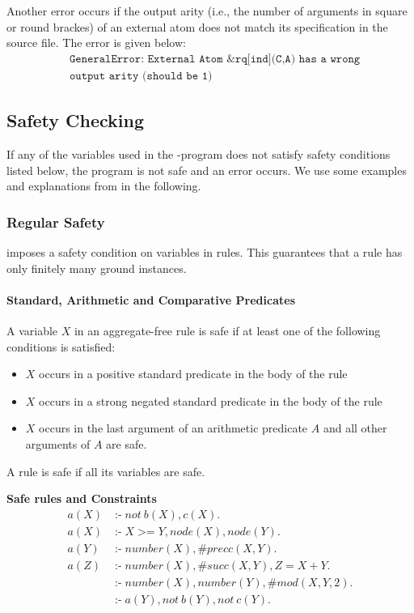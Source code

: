 \documentclass[a4paper, titlepage]{article}
\DeclareMathOperator{\leftimpl}{:-}
\DeclareMathOperator{\geeq}{>=}
\begin{document}
Another error occurs if the output arity (i.e., the number of arguments in square or round brackes) of an external atom does not 
match its specification in the source file. The error is given below:
\begin{align*}
& \texttt{GeneralError:~External Atom \&rq[ind](C,A) has a wrong} \\
& \texttt{output arity (should be 1)}
\end{align*}  

\subsection{Safety Checking}
\label{safetyCheck}
If any of the variables used in the \hex{}-program
does not satisfy safety conditions listed below,
the program is not safe and an error occurs.
We use some examples and explanations 
from \cite{brfwilvpg2009} in the following. 

\subsubsection{Regular Safety}
\dlvhex{} imposes a safety condition on variables in rules. 
This guarantees that a rule has only finitely many ground instances.

\paragraph{Standard, Arithmetic and Comparative Predicates}
A variable $X$ in an aggregate-free rule is safe if at least one 
of the following conditions is satisfied:
\begin{itemize}
\item $X$ occurs in a positive standard predicate in the 
body of the rule
\item $X$ occurs in a strong negated standard predicate in 
the body of the rule
\item $X$ occurs in the last argument of an arithmetic 
predicate $A$ and all other arguments of $A$ are safe.
\end{itemize}
A rule is safe if all its variables are safe.
\begin{exmp} \textbf{Safe rules and Constraints}
\begin{align*}
a(X)& \leftimpl not \ b(X), c(X). \\
a(X)& \leftimpl X \geeq Y, node(X), node(Y).\\
a(Y)& \leftimpl number(X), \#precc(X,Y). \\
a(Z)& \leftimpl number(X), \#succ(X,Y),Z=X+Y.\\
    &\leftimpl number(X), number(Y), \#mod(X,Y,2).\\
    &\leftimpl a(Y), not \ b(Y), not \ c(Y). 
\end{align*}
\end{exmp}
\end{document}
